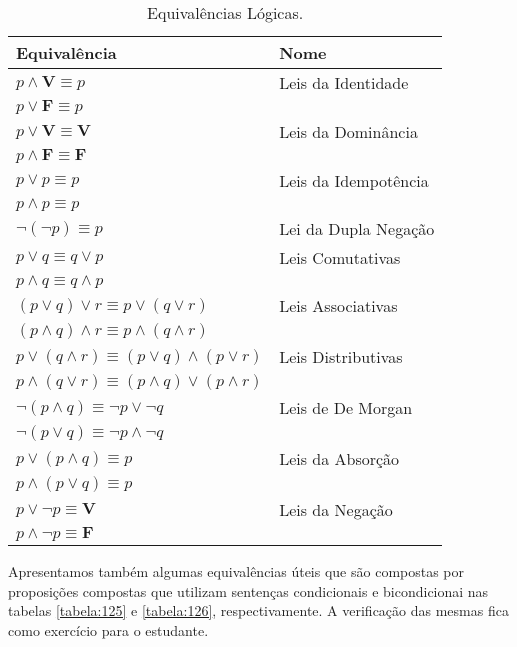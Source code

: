 \begin{table}[H]
	\centering
	\begin{tabular}{|l|l|}%
	\toprule
	\textbf{Equivalência} & \textbf{Nome}\\
	\midrule
	$p \land \textbf{V} \equiv p$ &	Leis da Identidade\\
	$p \lor \textbf{F} \equiv p$ &	\\
	\midrule
	$p \lor \textbf{V} \equiv \textbf{V}$ &	Leis da Dominância\\
	$p \land \textbf{F} \equiv \textbf{F}$ &\\
	\midrule
	$p \lor p \equiv p$ &	Leis da Idempotência\\
	$p \land p \equiv p$ &	\\
	\midrule
	$\lnot (\lnot p) \equiv p$ & Lei da Dupla Negação\\
	\midrule
	$p \lor q \equiv q \lor p$ & Leis Comutativas\\
	$p \land q \equiv q \land p$ &\\
	\midrule
	$(p \lor q) \lor r \equiv p \lor (q \lor r)$ & Leis Associativas\\
	$(p \land q) \land r \equiv p \land (q \land r)$ &\\
	\midrule
	$p \lor (q \land r) \equiv (p \lor q) \land (p \lor r)$ & Leis Distributivas \\
	$p \land (q \lor r) \equiv (p \land q) \lor (p \land r)$ & \\
	\midrule
	$\lnot (p \land q) \equiv \lnot p \lor \lnot q$ & Leis de De Morgan\\
	$\lnot (p \lor q) \equiv \lnot p \land \lnot q$ &\\
	\midrule
	$p \lor (p \land q) \equiv p$ & Leis da Absorção\\
	$p \land (p \lor q) \equiv p$ &\\
	\midrule
	$p \lor \lnot p \equiv \textbf{V}$ & Leis da Negação\\
	$p \land \lnot p \equiv \textbf{F}$ &	\\
	\bottomrule%
	\end{tabular}%
	\caption{Equivalências Lógicas.}
	\label{tabela:124}
\end{table}

Apresentamos também algumas equivalências úteis que são compostas por
proposições compostas que utilizam sentenças condicionais e bicondicionai nas
tabelas \ref{tabela:125} e \ref{tabela:126}, respectivamente. A verificação das
mesmas fica como exercício para o estudante.


